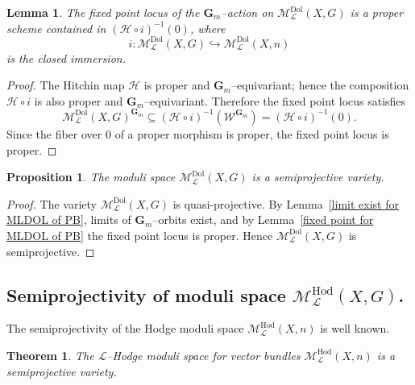 \documentclass[12pt,reqno]{amsart}
\numberwithin{equation}{subsection}
\newtheorem{thm}[equation]{Theorem}
\newtheorem{lem}[equation]{Lemma}
\newtheorem{proposition}[equation]{Proposition}
\theoremstyle{definition}
\theoremstyle{theorem}
\begin{document}
\begin{lem}\label{fixed point for MLDOL of PB}
	The fixed point locus of the $\mathbf{G}_{m}$--action on
	$\mathcal{M}^{\mathrm{Dol}}_{\mathcal{L}}(X,G)$
	is a proper scheme contained in
	$(\mathcal{H}\circ i)^{-1}(0)$,
	where
	\[
	i:\mathcal{M}^{\mathrm{Dol}}_{\mathcal{L}}(X,G)
	\hookrightarrow
	\mathcal{M}^{\mathrm{Dol}}_{\mathcal{L}}(X,n)
	\]
	is the closed immersion.
\end{lem}

\begin{proof}
	The Hitchin map $\mathcal{H}$ is proper and $\mathbf{G}_{m}$--equivariant;
	hence the composition $\mathcal{H}\circ i$ is also proper and
	$\mathbf{G}_{m}$--equivariant.
	Therefore the fixed point locus satisfies
	\[
	\mathcal{M}^{\mathrm{Dol}}_{\mathcal{L}}(X,G)^{\mathbf{G}_{m}}
	\subseteq
	(\mathcal{H}\circ i)^{-1}(\mathcal{W}^{\mathbf{G}_{m}})
	=
	(\mathcal{H}\circ i)^{-1}(0).
	\]
	Since the fiber over $0$ of a proper morphism is proper, the fixed point
	locus is proper.
\end{proof}

\begin{proposition}\label{semiprojectivity of MLDOL(X,G)}
	The moduli space $\mathcal{M}^{\mathrm{Dol}}_{\mathcal{L}}(X,G)$
	is a semiprojective variety.
\end{proposition}

\begin{proof}
	The variety $\mathcal{M}^{\mathrm{Dol}}_{\mathcal{L}}(X,G)$ is
	quasi-projective.
	By Lemma~\eqref{limit exist for MLDOL of PB}, limits of $\mathbf{G}_{m}$--orbits
	exist, and by Lemma~\eqref{fixed point for MLDOL of PB} the fixed point locus
	is proper.
	Hence $\mathcal{M}^{\mathrm{Dol}}_{\mathcal{L}}(X,G)$ is semiprojective.
\end{proof}


\subsection{Semiprojectivity of moduli space $\mathcal{M}_{\mathcal{L}}^{\text{Hod}}(X,G)$.}
The semiprojectivity of the Hodge moduli space
$\mathcal{M}^{\mathrm{Hod}}_{\mathcal{L}}(X,n)$
is well known.

\begin{thm}\label{thm: semiprojectivity of MLHOD(X,n)}
	\cite[\S\,4, Th.~4.12]{Alfaya-Oliveire-2024}
	The $\mathcal{L}$--Hodge moduli space for vector bundles
	$\mathcal{M}^{\mathrm{Hod}}_{\mathcal{L}}(X,n)$
	is a semiprojective variety.
\end{thm}
\end{document}
